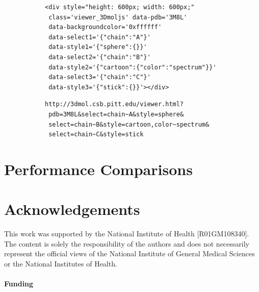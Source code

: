 \documentclass[]{bioinfo}
\begin{document}
\begin{figure}
\begin{minipage}[b]{\linewidth}
\begin{subfigure}[b]{\linewidth} \centering
\begin{verbatim}
<div style="height: 600px; width: 600px;" 
 class='viewer_3Dmoljs' data-pdb='3M8L'
 data-backgroundcolor='0xffffff'  
 data-select1='{"chain":"A"}'
 data-style1='{"sphere":{}}'
 data-select2='{"chain":"B"}'
 data-style2='{"cartoon":{"color":"spectrum"}}'
 data-select3='{"chain":"C"}'
 data-style3='{"stick":{}}'></div>
\end{verbatim}
\caption{}\label{embed}
\end{subfigure}

\begin{subfigure}[b]{\linewidth} \centering
\begin{verbatim}
http://3dmol.csb.pitt.edu/viewer.html?
 pdb=3M8L&select=chain~A&style=sphere&
 select=chain~B&style=cartoon,color~spectrum&
 select=chain~C&style=stick
\end{verbatim}
\caption{}\label{url}
\end{subfigure}
\end{minipage}

\end{figure}
\section{Performance Comparisons}



\section*{Acknowledgements}
This work was supported by the National Institute of Health [R01GM108340].
The content is solely the responsibility of the authors and does not necessarily
represent the official views of the National Institute of General Medical Sciences
or the National Institutes of Health.
\paragraph{Funding\textcolon} 



\end{document}
